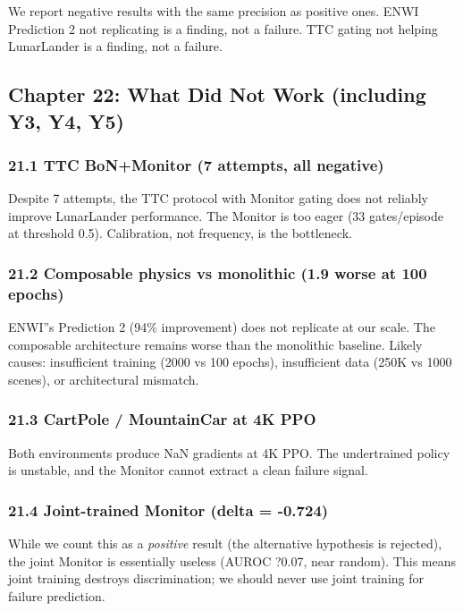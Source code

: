 \documentclass[11pt]{article}
\begin{document}
We report negative results with the same precision as positive ones. ENWI
Prediction 2 not replicating is a finding, not a failure. TTC gating not
helping LunarLander is a finding, not a failure.

\hrulefill

\subsection{Chapter 22: What Did Not Work (including Y3, Y4, Y5)}

\subsubsection{21.1 TTC BoN+Monitor (7 attempts, all negative)}

Despite 7 attempts, the TTC protocol with Monitor gating does not reliably
improve LunarLander performance. The Monitor is too eager (33 gates/episode at
threshold 0.5). Calibration, not frequency, is the bottleneck.

\subsubsection{21.2 Composable physics vs monolithic (1.9 worse at 100 epochs)}

ENWI''s Prediction 2 (94\% improvement) does not replicate at our scale. The
composable architecture remains worse than the monolithic baseline. Likely
causes: insufficient training (2000 vs 100 epochs), insufficient data (250K vs
1000 scenes), or architectural mismatch.

\subsubsection{21.3 CartPole / MountainCar at 4K PPO}

Both environments produce NaN gradients at 4K PPO. The undertrained policy is
unstable, and the Monitor cannot extract a clean failure signal.

\subsubsection{21.4 Joint-trained Monitor (delta = -0.724)}

While we count this as a \textit{positive} result (the alternative hypothesis is
rejected), the joint Monitor is essentially useless (AUROC ?0.07, near
random). This means joint training destroys discrimination; we should
never use joint training for failure prediction.
\end{document}
